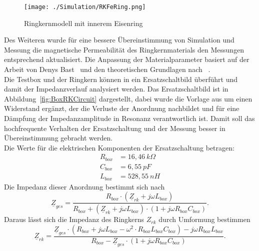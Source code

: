                 \begin{figure}[htb]
                    \centering
                    \texttt{[image: ./Simulation/RKFeRing.png]}
                    \caption{Ringkernmodell mit innerem Eisenring}
                    \label{fig:RKFeRingCST}
                \end{figure}
            
            \par
            Des Weiteren wurde für eine bessere Übereinstimmung von Simulation und Messung die magnetische Permeabilität des Ringkernmaterials den Messungen entsprechend aktualisiert. Die Anpassung der Materialparameter basiert auf der Arbeit von Denys Bast~\citep{bast2017ba} und den theoretischen Grundlagen nach ~\citep{Klingbeil2008}.\\
            Die Testbox und der Ringkern können in ein Ersatzschaltbild überführt und damit der Impedanzverlauf analysiert werden. Das Ersatzschaltbild ist in Abbildung~\ref{fig:BoxRKCircuit} dargestellt, dabei wurde die Vorlage aus \citep{bast2017ba} um einen Widerstand ergänzt, der die Verluste der Anordnung nachbildet und für eine Dämpfung der Impedanzamplitude in Resonanz verantwortlich ist. Damit soll das hochfrequente Verhalten der Ersatzschaltung und der Messung besser in Übereinstimmung gebracht werden.\\
            Die Werte für die elektrischen Komponenten der Ersatzschaltung betragen:
                \begin{align}
                    R_{box} &= 16,46~k\Omega \nonumber\\
                    C_{box} &= 6,55~pF \nonumber\\
                    L_{box} &= 528,55~nH \nonumber
                \end{align}
            Die Impedanz dieser Anordnung bestimmt sich nach
                \begin{equation}\label{eq:Zges}
                    \underline{Z}_{ges} = \frac{R_{box}\cdot(\underline{Z}_{rk}+j\omega L_{box})}{R_{box}+(\underline{Z}_{rk}+j\omega L_{box})\cdot(1+j\omega R_{box}C_{box})}.
                \end{equation}
            Daraus lässt sich die Impedanz des Ringkerns $Z_{rk}$ durch Umformung bestimmen
                \begin{equation}\label{eq:Zrk}
                \underline{Z}_{rk} = \frac{\underline{Z}_{ges}\cdot(R_{box}+j\omega L_{box}-\omega^2\cdot R_{box}L_{box}C_{box}) - j\omega R_{box}L_{box}}{R_{box}-\underline{Z}_{ges}\cdot(1+j\omega R_{box}C_{box})}.
                \end{equation}
